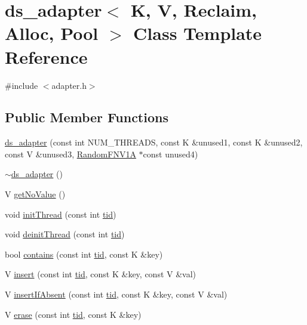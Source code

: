 \hypertarget{classds__adapter}{}\section{ds\+\_\+adapter$<$ K, V, Reclaim, Alloc, Pool $>$ Class Template Reference}
\label{classds__adapter}


{\ttfamily \#include $<$adapter.\+h$>$}

\subsection*{Public Member Functions}
\begin{DoxyCompactItemize}
\item 
\hyperlink{classds__adapter_ab37964787a66459a325cf75ac91da4e8}{ds\+\_\+adapter} (const int N\+U\+M\+\_\+\+T\+H\+R\+E\+A\+DS, const K \&unused1, const K \&unused2, const V \&unused3, \hyperlink{classRandomFNV1A}{Random\+F\+N\+V1A} $\ast$const unused4)
\item 
\hyperlink{classds__adapter_a366f46dd39d59f2d4a147589f5fd98e3}{$\sim$ds\+\_\+adapter} ()
\item 
V \hyperlink{classds__adapter_a9e1e4aec136b351d1a6820d70484a6c5}{get\+No\+Value} ()
\item 
void \hyperlink{classds__adapter_a3733f6a6b57312b1b5e4fb5181d82a0b}{init\+Thread} (const int \hyperlink{microbench_2main_8cpp_a9ca9869868fe7e7a38a921cc7de4103f}{tid})
\item 
void \hyperlink{classds__adapter_a173ca48b19fc1dc346159ea582c690cd}{deinit\+Thread} (const int \hyperlink{microbench_2main_8cpp_a9ca9869868fe7e7a38a921cc7de4103f}{tid})
\item 
bool \hyperlink{classds__adapter_aecf1899dbe9fae93c72ee2b5549cf6eb}{contains} (const int \hyperlink{microbench_2main_8cpp_a9ca9869868fe7e7a38a921cc7de4103f}{tid}, const K \&key)
\item 
V \hyperlink{classds__adapter_a6c0fc676d77e30e14946baf325174739}{insert} (const int \hyperlink{microbench_2main_8cpp_a9ca9869868fe7e7a38a921cc7de4103f}{tid}, const K \&key, const V \&val)
\item 
V \hyperlink{classds__adapter_ae9cb29ad0c0338c0e1d12ef97e008135}{insert\+If\+Absent} (const int \hyperlink{microbench_2main_8cpp_a9ca9869868fe7e7a38a921cc7de4103f}{tid}, const K \&key, const V \&val)
\item 
V \hyperlink{classds__adapter_a1bf459e8449df93cc738a644aeffdcfb}{erase} (const int \hyperlink{microbench_2main_8cpp_a9ca9869868fe7e7a38a921cc7de4103f}{tid}, const K \&key)

\end{DoxyCompactItemize}

